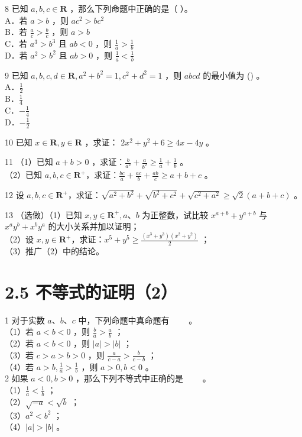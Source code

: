 \documentclass[10pt]{article}
\begin{document}
8 已知 \(a, b, c \in \mathbf{R}\) ，那么下列命题中正确的是（ ）。\\
A．若 \(a>b\) ，则 \(a c^{2}>b c^{2}\)\\
B．若 \(\frac{a}{c}>\frac{b}{c}\) ，则 \(a>b\)\\
C．若 \(a^{3}>b^{3}\) 且 \(a b<0\) ，则 \(\frac{1}{a}>\frac{1}{b}\)\\
D．若 \(a^{2}>b^{2}\) 且 \(a b>0\) ，则 \(\frac{1}{a}<\frac{1}{b}\)

9 已知 \(a, b, c, d \in \mathbf{R}, a^{2}+b^{2}=1, c^{2}+d^{2}=1\) ，则 \(a b c d\) 的最小值为 () 。\\
A．\(\frac{1}{2}\)\\
B．\(\frac{1}{4}\)\\
C．\(-\frac{1}{4}\)\\
D．\(-\frac{1}{2}\)

10 已知 \(x \in \mathbf{R}, y \in \mathbf{R}\) ，求证： \(2 x^{2}+y^{2}+6 \geqslant 4 x-4 y\) 。

11 （1）已知 \(a+b>0\) ，求证：\(\frac{b}{a^{2}}+\frac{a}{b^{2}} \geqslant \frac{1}{a}+\frac{1}{b}\) 。\\
（2）已知 \(a, b, c \in \mathbf{R}^{+}\)，求证：\(\frac{b c}{a}+\frac{a c}{b}+\frac{a b}{c} \geqslant a+b+c\) 。

12 设 \(a, b, c \in \mathbf{R}^{+}\)，求证：\(\sqrt{a^{2}+b^{2}}+\sqrt{b^{2}+c^{2}}+\sqrt{c^{2}+a^{2}} \geqslant \sqrt{2}(a+b+c)\) 。

13 （选做）（1）已知 \(x, y \in \mathbf{R}^{+}, a 、 b\) 为正整数，试比较 \(x^{a+b}+y^{a+b}\) 与 \(x^{a} y^{b}+x^{b} y^{a}\) 的大小关系并加以证明；\\
（2）设 \(x, y \in \mathbf{R}^{+}\)，求证：\(x^{5}+y^{5} \geqslant \frac{\left(x^{3}+y^{3}\right)\left(x^{2}+y^{2}\right)}{2}\) ；\\
（3）推广（2）中的结论。

\section*{2.5 不等式的证明（2）}
1 对于实数 \(a 、 b 、 c\) 中，下列命题中真命题有 \(\qquad\)。\\
（1）若 \(a<b<0\) ，则 \(\frac{b}{a}>\frac{a}{b}\) ；\\
（2）若 \(a<b<0\) ，则 \(|a|>|b|\) ；\\
（3）若 \(c>a>b>0\) ，则 \(\frac{a}{c-a}>\frac{b}{c-b}\) ；\\
（4）若 \(a>b, \frac{1}{a}>\frac{1}{b}\) ，则 \(a>0, b<0\) 。\\
2 如果 \(a<0, b>0\) ，那么下列不等式中正确的是 \(\qquad\)。\\
（1）\(\frac{1}{a}<\frac{1}{b}\) ；\\
（2）\(\sqrt{-a}<\sqrt{b}\) ；\\
（3）\(a^{2}<b^{2}\) ；\\
（4）\(|a|>|b|\) 。
\end{document}

